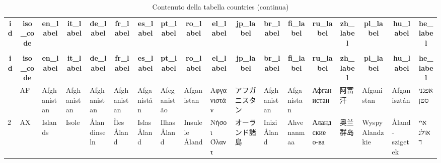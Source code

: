 %
%
 \begin{longtable}{|l|l|l|l|l|l|l|l|l|l|l|l|l|l|l|l|l|l|} 
 \hline \endhead \hline \endfoot \hline 
 \caption{Contenuto della tabella countries} \label{tab:countries-data} \\\hline \multicolumn{1}{|c|}{\textbf{id}} & \multicolumn{1}{|c|}{\textbf{iso\_code}} & \multicolumn{1}{|c|}{\textbf{en\_label}} & \multicolumn{1}{|c|}{\textbf{it\_label}} & \multicolumn{1}{|c|}{\textbf{de\_label}} & \multicolumn{1}{|c|}{\textbf{fr\_label}} & \multicolumn{1}{|c|}{\textbf{es\_label}} & \multicolumn{1}{|c|}{\textbf{pt\_label}} & \multicolumn{1}{|c|}{\textbf{ro\_label}} & \multicolumn{1}{|c|}{\textbf{el\_label}} & \multicolumn{1}{|c|}{\textbf{jp\_label}} & \multicolumn{1}{|c|}{\textbf{br\_label}} & \multicolumn{1}{|c|}{\textbf{fi\_label}} & \multicolumn{1}{|c|}{\textbf{ru\_label}} & \multicolumn{1}{|c|}{\textbf{zh\_label}} & \multicolumn{1}{|c|}{\textbf{pl\_label}} & \multicolumn{1}{|c|}{\textbf{hu\_label}} & \multicolumn{1}{|c|}{\textbf{he\_label}} \\ \hline \hline  \endfirsthead 
\caption{Contenuto della tabella countries (continua)} \\ \hline \multicolumn{1}{|c|}{\textbf{id}} & \multicolumn{1}{|c|}{\textbf{iso\_code}} & \multicolumn{1}{|c|}{\textbf{en\_label}} & \multicolumn{1}{|c|}{\textbf{it\_label}} & \multicolumn{1}{|c|}{\textbf{de\_label}} & \multicolumn{1}{|c|}{\textbf{fr\_label}} & \multicolumn{1}{|c|}{\textbf{es\_label}} & \multicolumn{1}{|c|}{\textbf{pt\_label}} & \multicolumn{1}{|c|}{\textbf{ro\_label}} & \multicolumn{1}{|c|}{\textbf{el\_label}} & \multicolumn{1}{|c|}{\textbf{jp\_label}} & \multicolumn{1}{|c|}{\textbf{br\_label}} & \multicolumn{1}{|c|}{\textbf{fi\_label}} & \multicolumn{1}{|c|}{\textbf{ru\_label}} & \multicolumn{1}{|c|}{\textbf{zh\_label}} & \multicolumn{1}{|c|}{\textbf{pl\_label}} & \multicolumn{1}{|c|}{\textbf{hu\_label}} & \multicolumn{1}{|c|}{\textbf{he\_label}} \\ \hline \hline \endhead \endfoot
1 & AF & Afghanistan & Afghanistan & Afghanistan & Afghanistan & Afganistán & Afeganistão & Afganistan & Αφγανιστάν & アフガニスタン & Afghanistan & Afganistan & Афганистан & 阿富汗 & Afganistan & Afganisztán & אפגניסטן \\ \hline 
2 & AX & Islands & Isole  & Ålandinseln & Îles Åland & Islas Åland & Ilhas Åland & Insulele Åland & Νήσοι Όλαντ & オーランド諸島 & Inizi Åland & Ahvenanmaa & Аландские о-ва & 奥兰群岛 & Wyspy Alandzkie & Åland-szigetek & איי אולנד \\ \hline 

\end{longtable}
